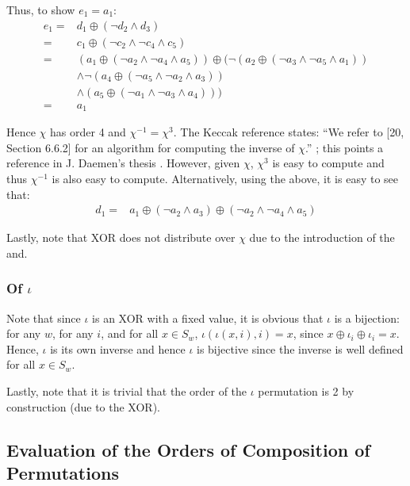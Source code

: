 \documentclass[10pt,twocolumn,twoside]{pnas-new}
\begin{document}
Thus, to show $e_1 = a_1$:
\begin{align*}
    e_1 = & d_1 \oplus (\lnot d_2 \land d_3) \\
        = & c_1 \oplus (\lnot c_2 \land \lnot c_4 \land c_5) \\
        = & (a_1 \oplus (\lnot a_2 \land \lnot a_4 \land a_5)) \oplus (\lnot (a_2 \oplus (\lnot a_3 \land \lnot a_5 \land a_1)) \\
          & \land \lnot (a_4 \oplus (\lnot a_5 \land \lnot a_2 \land a_3)) \\
          & \land (a_5 \oplus (\lnot a_1 \land \lnot a_3 \land a_4))) \\
        = & a_1
\end{align*}

Hence $\chi$ has order 4 and $\chi^{-1} = \chi^{3}$. The Keccak reference states:
``We refer to [20, Section 6.6.2] for an algorithm for computing the inverse of $\chi$.''
\cite{Keccak3}; this points a reference in J. Daemen's thesis \cite{DaemenThesis}.
However, given $\chi$, $\chi^{3}$ is easy to compute and thus $\chi^{-1}$ is also
easy to compute. Alternatively, using the above, it is easy to see that:
\begin{align*}
    d_1 = & a_1 \oplus (\lnot a_2 \land a_3) \oplus (\lnot a_2 \land \lnot a_4 \land a_5)
\end{align*}

Lastly, note that XOR does not distribute over $\chi$ due to the
introduction of the and.

\subsubsection{Of $\iota$} \label{sec:p:i}


Note that since $\iota$ is an XOR with a fixed value, it is obvious that
$\iota$ is a bijection: for any $w$, for any $i$, and for all $x \in S_{w}$,
$\iota(\iota(x, i), i) = x$, since $x \oplus \iota_{i} \oplus \iota_{i} = x$.
Hence, $\iota$ is its own inverse and hence $\iota$ is bijective since the
inverse is well defined for all $x \in S_{w}$.

Lastly, note that it is trivial that the order of the $\iota$ permutation is
2 by construction (due to the XOR).

\subsection{Evaluation of the Orders of Composition of Permutations} \label{sec:p:composition}
\end{document}
